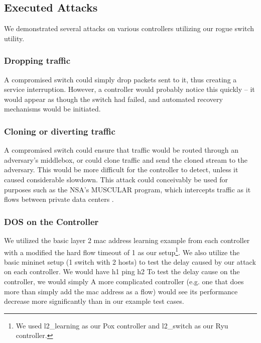 
\subsection{Executed Attacks} 

We demonstrated several attacks on various controllers utilizing our rogue switch utility. 
   
\subsubsection{Dropping traffic} 
A compromised switch could simply drop packets sent to it, thus creating a service interruption. However, a controller would probably notice this quickly -- it would appear as though the switch had failed, and automated recovery mechanisms would be initiated.

\subsubsection{Cloning or diverting traffic}
A compromised switch could ensure that traffic would be routed through an adversary’s middlebox, or could clone traffic and send the cloned stream to the adversary. This would be more difficult for the controller to detect, unless it caused considerable slowdown. This attack could conceivably be used for purposes such as the NSA’s MUSCULAR program, which intercepts traffic as it flows between private data centers \cite{muscular}. 

\subsubsection{DOS on the Controller}
We utilized the basic layer 2 mac address learning example from each controller with a modified the hard flow timeout of 1 as our setup\footnote{We used l2\_learning as our Pox controller and l2\_switch as our Ryu controller.}. We also utilize the basic mininet setup (1 switch with 2 hosts) to test the delay caused by our attack on each controller. We would have h1 ping h2 To test the delay cause on the controller, we would simply A more complicated controller (e.g. one that does more than simply add the mac address as a flow) would see its performance decrease more significantly than in our example test cases.

